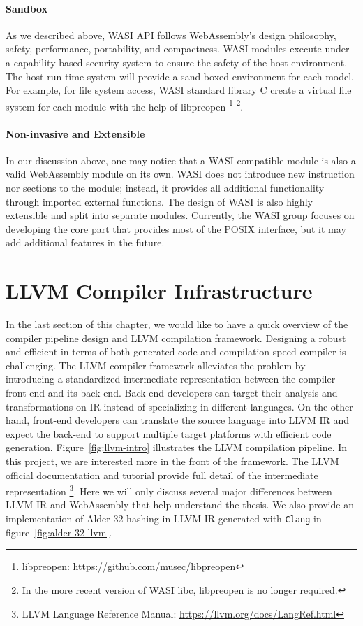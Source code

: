 \paragraph{Sandbox}
As we described above, WASI API follows WebAssembly's design philosophy, safety, performance, portability, and compactness. WASI modules execute under a capability-based security system to ensure the safety of the host environment. The host run-time system will provide a sand-boxed environment for each model. For example, for file system access, WASI standard library C create a virtual file system for each module with the help of libpreopen \footnote{libpreopen: \url{https://github.com/musec/libpreopen}} \footnote{In the more recent version of WASI libc, libpreopen is no longer required.}.

\paragraph{Non-invasive and Extensible}
In our discussion above, one may notice that a WASI-compatible module is also a valid WebAssembly module on its own. WASI does not introduce new instruction nor sections to the module; instead, it provides all additional functionality through imported external functions. The design of WASI is also highly extensible and split into separate modules. Currently, the WASI group focuses on developing the core part that provides most of the POSIX interface, but it may add additional features in the future.

\section{LLVM Compiler Infrastructure}

In the last section of this chapter, we would like to have a quick overview of the compiler pipeline design and LLVM compilation framework. Designing a robust and efficient in terms of both generated code and compilation speed compiler is challenging. The LLVM compiler framework \cite{llvm-thesis} alleviates the problem by introducing a standardized intermediate representation between the compiler front end and its back-end. Back-end developers can target their analysis and transformations on IR instead of specializing in different languages. On the other hand, front-end developers can translate the source language into LLVM IR and expect the back-end to support multiple target platforms with efficient code generation. Figure~\ref{fig:llvm-intro} illustrates the LLVM compilation pipeline. In this project, we are interested more in the front of the framework. The LLVM official documentation and tutorial provide full detail of the intermediate representation \footnote{LLVM Language Reference Manual: \url{https://llvm.org/docs/LangRef.html}}. Here we will only discuss several major differences between LLVM IR and WebAssembly that help understand the thesis. We also provide an implementation of Alder-32 hashing in LLVM IR generated with \texttt{Clang} in figure~\ref{fig:alder-32-llvm}. 

